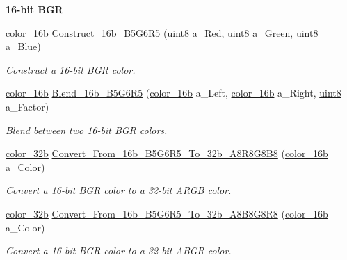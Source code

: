 \begin{Indent}{\bf 16-\/bit BGR}\par
\begin{DoxyCompactItemize}
\item 
\hyperlink{namespacetil_a952afde951048a62d0f970dc6ca89a45}{color\_\-16b} \hyperlink{namespacetil_accd82fcffbc0f256c971beb941ab9166}{Construct\_\-16b\_\-B5G6R5} (\hyperlink{namespacetil_a7a75b0e7e2cd3f19ea51c8c02fd242f8}{uint8} a\_\-Red, \hyperlink{namespacetil_a7a75b0e7e2cd3f19ea51c8c02fd242f8}{uint8} a\_\-Green, \hyperlink{namespacetil_a7a75b0e7e2cd3f19ea51c8c02fd242f8}{uint8} a\_\-Blue)
\begin{DoxyCompactList}\small\item\em Construct a 16-\/bit BGR color. \item\end{DoxyCompactList}\item 
\hyperlink{namespacetil_a952afde951048a62d0f970dc6ca89a45}{color\_\-16b} \hyperlink{namespacetil_a7db23332b0b6b0922c591645e418d3f1}{Blend\_\-16b\_\-B5G6R5} (\hyperlink{namespacetil_a952afde951048a62d0f970dc6ca89a45}{color\_\-16b} a\_\-Left, \hyperlink{namespacetil_a952afde951048a62d0f970dc6ca89a45}{color\_\-16b} a\_\-Right, \hyperlink{namespacetil_a7a75b0e7e2cd3f19ea51c8c02fd242f8}{uint8} a\_\-Factor)
\begin{DoxyCompactList}\small\item\em Blend between two 16-\/bit BGR colors. \item\end{DoxyCompactList}\item 
\hyperlink{namespacetil_a8eb2d871b8a6ffb55b3eeb720207a6cb}{color\_\-32b} \hyperlink{namespacetil_ae0e2e24eaa0772d2ca196be6cf18b2b8}{Convert\_\-From\_\-16b\_\-B5G6R5\_\-To\_\-32b\_\-A8R8G8B8} (\hyperlink{namespacetil_a952afde951048a62d0f970dc6ca89a45}{color\_\-16b} a\_\-Color)
\begin{DoxyCompactList}\small\item\em Convert a 16-\/bit BGR color to a 32-\/bit ARGB color. \item\end{DoxyCompactList}\item 
\hyperlink{namespacetil_a8eb2d871b8a6ffb55b3eeb720207a6cb}{color\_\-32b} \hyperlink{namespacetil_aefd9e893058049b916052a7325c827ba}{Convert\_\-From\_\-16b\_\-B5G6R5\_\-To\_\-32b\_\-A8B8G8R8} (\hyperlink{namespacetil_a952afde951048a62d0f970dc6ca89a45}{color\_\-16b} a\_\-Color)
\begin{DoxyCompactList}\small\item\em Convert a 16-\/bit BGR color to a 32-\/bit ABGR color. \item\end{DoxyCompactList}\end{DoxyCompactItemize}
\end{Indent}
